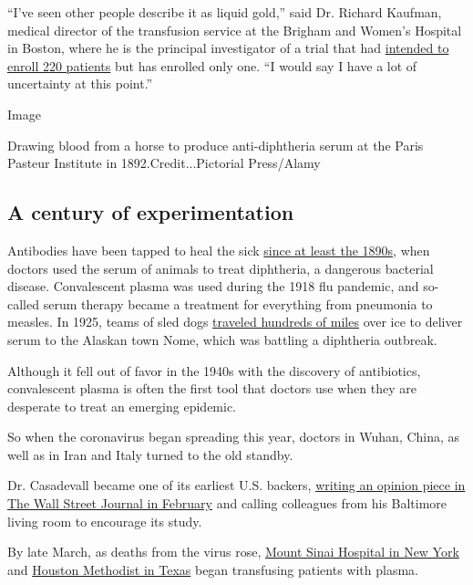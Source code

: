 ``I've seen other people describe it as liquid gold,'' said Dr. Richard
Kaufman, medical director of the transfusion service at the Brigham and
Women's Hospital in Boston, where he is the principal investigator of a
trial that had
\href{https://clinicaltrials.gov/ct2/show/NCT04361253?term=convalescent+plasma\&type=Intr\&cond=COVID\&intr=randomized\&draw=3\&rank=11}{intended
to enroll 220 patients} but has enrolled only one. ``I would say I have
a lot of uncertainty at this point.''

Image

Drawing blood from a horse to produce anti-diphtheria serum at the Paris
Pasteur Institute in 1892.Credit...Pictorial Press/Alamy

\hypertarget{a-century-of-experimentation}{%
\subsection{A century of
experimentation}\label{a-century-of-experimentation}}

Antibodies have been tapped to heal the sick
\href{https://academic.oup.com/cid/article/21/1/150/402600}{since at
least the 1890s}, when doctors used the serum of animals to treat
diphtheria, a dangerous bacterial disease. Convalescent plasma was used
during the 1918 flu pandemic, and so-called serum therapy became a
treatment for everything from pneumonia to measles. In 1925, teams of
sled dogs
\href{http://www.bbc.com/earth/story/20161014-in-1925-a-remote-town-was-saved-from-lethal-disease-by-dogs}{traveled
hundreds of miles} over ice to deliver serum to the Alaskan town Nome,
which was battling a diphtheria outbreak.

Although it fell out of favor in the 1940s with the discovery of
antibiotics, convalescent plasma is often the first tool that doctors
use when they are desperate to treat an emerging epidemic.

So when the coronavirus began spreading this year, doctors in Wuhan,
China, as well as in Iran and Italy turned to the old standby.

Dr. Casadevall became one of its earliest U.S. backers,
\href{https://www.wsj.com/articles/how-a-boys-blood-stopped-an-outbreak-11582847330}{writing
an opinion piece in The Wall Street Journal in February} and calling
colleagues from his Baltimore living room to encourage its study.

By late March, as deaths from the virus rose,
\href{https://www.nytimes.com/2020/03/26/health/plasma-coronavirus-treatment.html}{Mount
Sinai Hospital in New York} and
\href{https://www.houstonmethodist.org/blog/articles/2020/mar/coronavirus-blood-transfusion-therapy-may-offer-promise-for-critically-ill-patients/}{Houston
Methodist in Texas} began transfusing patients with plasma.

